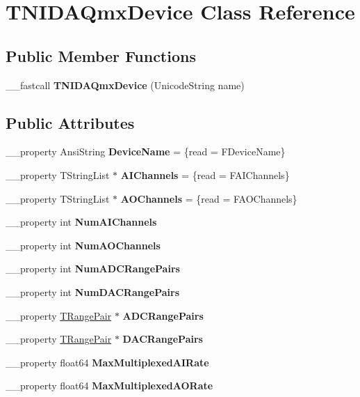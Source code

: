 \hypertarget{class_t_n_i_d_a_qmx_device}{\section{T\+N\+I\+D\+A\+Qmx\+Device Class Reference}
\label{class_t_n_i_d_a_qmx_device}
}
\subsection*{Public Member Functions}
\begin{DoxyCompactItemize}
\item 
\hypertarget{class_t_n_i_d_a_qmx_device_aff2f6847d7fad1f51a1f3902fb59ba36}{\+\_\+\+\_\+fastcall {\bfseries T\+N\+I\+D\+A\+Qmx\+Device} (Unicode\+String name)}\label{class_t_n_i_d_a_qmx_device_aff2f6847d7fad1f51a1f3902fb59ba36}

\end{DoxyCompactItemize}
\subsection*{Public Attributes}
\begin{DoxyCompactItemize}
\item 
\hypertarget{class_t_n_i_d_a_qmx_device_a900d487b0bd4b2577dc2d56eeeb8eed0}{\+\_\+\+\_\+property Ansi\+String {\bfseries Device\+Name} = \{read = F\+Device\+Name\}}\label{class_t_n_i_d_a_qmx_device_a900d487b0bd4b2577dc2d56eeeb8eed0}

\item 
\hypertarget{class_t_n_i_d_a_qmx_device_a4d4e4c0f7b7cd8897e110c1aed53e806}{\+\_\+\+\_\+property T\+String\+List $\ast$ {\bfseries A\+I\+Channels} = \{read = F\+A\+I\+Channels\}}\label{class_t_n_i_d_a_qmx_device_a4d4e4c0f7b7cd8897e110c1aed53e806}

\item 
\hypertarget{class_t_n_i_d_a_qmx_device_a9f4aac7d6d820a0523c9c7913c63b613}{\+\_\+\+\_\+property T\+String\+List $\ast$ {\bfseries A\+O\+Channels} = \{read = F\+A\+O\+Channels\}}\label{class_t_n_i_d_a_qmx_device_a9f4aac7d6d820a0523c9c7913c63b613}

\item 
\+\_\+\+\_\+property int {\bfseries Num\+A\+I\+Channels}
\item 
\+\_\+\+\_\+property int {\bfseries Num\+A\+O\+Channels}
\item 
\+\_\+\+\_\+property int {\bfseries Num\+A\+D\+C\+Range\+Pairs}
\item 
\+\_\+\+\_\+property int {\bfseries Num\+D\+A\+C\+Range\+Pairs}
\item 
\+\_\+\+\_\+property \hyperlink{struct_t_range_pair}{T\+Range\+Pair} $\ast$ {\bfseries A\+D\+C\+Range\+Pairs}
\item 
\+\_\+\+\_\+property \hyperlink{struct_t_range_pair}{T\+Range\+Pair} $\ast$ {\bfseries D\+A\+C\+Range\+Pairs}
\item 
\+\_\+\+\_\+property float64 {\bfseries Max\+Multiplexed\+A\+I\+Rate}
\item 
\+\_\+\+\_\+property float64 {\bfseries Max\+Multiplexed\+A\+O\+Rate}
\end{DoxyCompactItemize}


